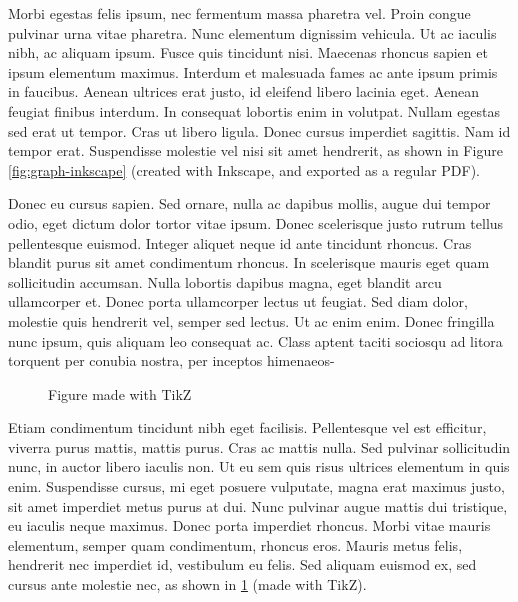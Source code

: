 Morbi egestas felis ipsum, nec fermentum massa pharetra vel. Proin congue pulvinar urna vitae pharetra. Nunc elementum dignissim vehicula. Ut ac iaculis nibh, ac aliquam ipsum. Fusce quis tincidunt nisi. Maecenas rhoncus sapien et ipsum elementum maximus. Interdum et malesuada fames ac ante ipsum primis in faucibus. Aenean ultrices erat justo, id eleifend libero lacinia eget. Aenean feugiat finibus interdum. In consequat lobortis enim in volutpat. Nullam egestas sed erat ut tempor. Cras ut libero ligula. Donec cursus imperdiet sagittis. Nam id tempor erat. Suspendisse molestie vel nisi sit amet hendrerit, as shown in Figure \ref{fig:graph-inkscape} (created with Inkscape, and exported as a regular PDF).


\begin{center}
\end{center}

Donec eu cursus sapien. Sed ornare, nulla ac dapibus mollis, augue dui tempor odio, eget dictum dolor tortor vitae ipsum. Donec scelerisque justo rutrum tellus pellentesque euismod. Integer aliquet neque id ante tincidunt rhoncus. Cras blandit purus sit amet condimentum rhoncus. In scelerisque mauris eget quam sollicitudin accumsan. Nulla lobortis dapibus magna, eget blandit arcu ullamcorper et. Donec porta ullamcorper lectus ut feugiat. Sed diam dolor, molestie quis hendrerit vel, semper sed lectus. Ut ac enim enim. Donec fringilla nunc ipsum, quis aliquam leo consequat ac. Class aptent taciti sociosqu ad litora torquent per conubia nostra, per inceptos himenaeos-

\begin{figure}[h]
\centering
{}
\caption{Figure made with TikZ} \label{fig:tikz}
\end{figure}

Etiam condimentum tincidunt nibh eget facilisis. Pellentesque vel est efficitur, viverra purus mattis, mattis purus. Cras ac mattis nulla. Sed pulvinar sollicitudin nunc, in auctor libero iaculis non. Ut eu sem quis risus ultrices elementum in quis enim. Suspendisse cursus, mi eget posuere vulputate, magna erat maximus justo, sit amet imperdiet metus purus at dui. Nunc pulvinar augue mattis dui tristique, eu iaculis neque maximus. Donec porta imperdiet rhoncus. Morbi vitae mauris elementum, semper quam condimentum, rhoncus eros. Mauris metus felis, hendrerit nec imperdiet id, vestibulum eu felis. Sed aliquam euismod ex, sed cursus ante molestie nec, as shown in \ref{fig:tikz} (made with TikZ).